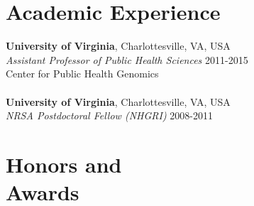 \documentclass[margin,line]{cv}
\begin{document}
\begin{resume}
    \section{\mysidestyle Academic Experience}

    \textbf{University of Virginia}, Charlottesville, VA, USA\\
    \textit{Assistant Professor of Public Health Sciences}                              \hfill 2011-2015\\
    Center for Public Health Genomics\\
    \\
    \textbf{University of Virginia}, Charlottesville, VA, USA\\
    \textit{NRSA Postdoctoral Fellow (NHGRI)}                                          \hfill 2008-2011\\


    \section{\mysidestyle Honors and\\Awards}


\end{resume}
\end{document}
